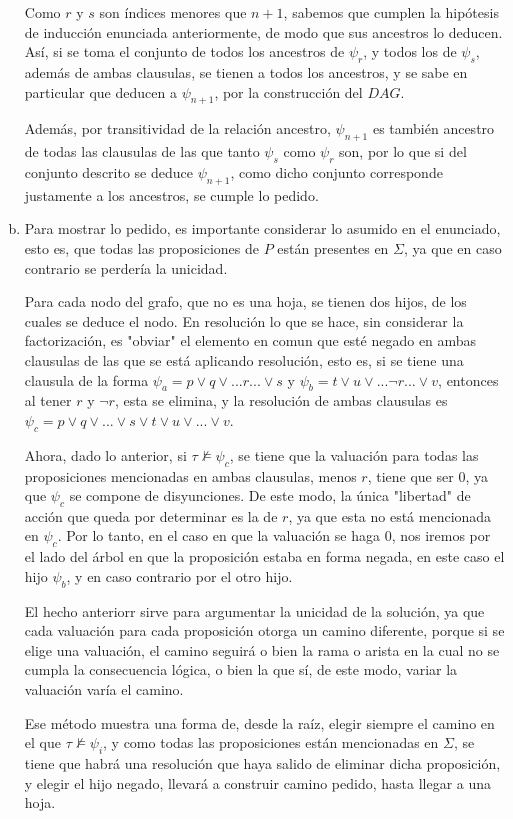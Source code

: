 \documentclass[letterpaper,10pt]{article}
\begin{document}
\begin{enumerate}[a)]
    Como $r$ y $s$ son índices menores que $n+1$, sabemos que cumplen la hipótesis de inducción enunciada anteriormente, de modo que sus ancestros lo deducen. Así, si se toma el conjunto de todos los ancestros de $\psi_r$, y todos los de $\psi_s$, además de ambas clausulas, se tienen a todos los ancestros, y se sabe en particular que deducen a $\psi_{n+1}$, por la construcción del $DAG$.

    Además, por transitividad de la relación ancestro, $\psi_{n+1}$ es también ancestro de todas las clausulas de las que tanto $\psi_s$ como $\psi_r$ son, por lo que si del conjunto descrito se deduce $\psi_{n+1}$, como dicho conjunto corresponde justamente a los ancestros, se cumple lo pedido.

    \item Para mostrar lo pedido, es importante considerar lo asumido en el enunciado, esto es, que todas las proposiciones de $P$ están presentes en $\Sigma$, ya que en caso contrario se perdería la unicidad.

    Para cada nodo del grafo, que no es una hoja, se tienen dos hijos, de los cuales se deduce el nodo. En resolución lo que se hace, sin considerar la factorización, es "obviar" el elemento en comun que esté negado en ambas clausulas de las que se está aplicando resolución, esto es, si se tiene una clausula de la forma $\psi_a = p \vee q \vee ... r ... \vee s $ y $\psi_b = t \vee u \vee ... \neg r ... \vee v $, entonces al tener $r$ y $\neg r$, esta se elimina, y la resolución de ambas clausulas es $\psi_c = p \vee q \vee ... \vee s \vee t \vee u \vee ... \vee v $.

    Ahora, dado lo anterior, si $\tau \not\models \psi_c$, se tiene que la valuación para todas las proposiciones mencionadas en ambas clausulas, menos $r$, tiene que ser 0, ya que $\psi_c$ se compone de disyunciones. De este modo, la única "libertad" de acción que queda por determinar es la de $r$, ya que esta no está mencionada en $\psi_c$. Por lo tanto, en el caso en que la valuación se haga 0, nos iremos por el lado del árbol en que la proposición estaba en forma negada, en este caso el hijo $\psi_b$, y en caso contrario por el otro hijo.

    El hecho anteriorr sirve para argumentar la unicidad de la solución, ya que cada valuación para cada proposición otorga un camino diferente, porque si se elige una valuación, el camino seguirá o bien la rama o arista en la cual no se cumpla la consecuencia lógica, o bien la que sí, de este modo, variar la valuación varía el camino.

    Ese método muestra una forma de, desde la raíz, elegir siempre el camino en el que $\tau \not\models \psi_i$, y como todas las proposiciones están mencionadas en $\Sigma$, se tiene que habrá una resolución que haya salido de eliminar dicha proposición, y elegir el hijo negado, llevará a construir camino pedido, hasta llegar a una hoja.


\end{enumerate}
\end{document}

